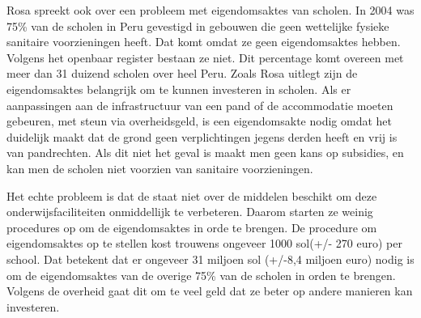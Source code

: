 Rosa spreekt ook over een probleem met eigendomsaktes van scholen. In 2004 was 75\% van de scholen in Peru gevestigd in gebouwen die geen wettelijke fysieke sanitaire voorzieningen heeft. Dat komt omdat ze geen eigendomsaktes hebben. Volgens het openbaar register bestaan ze niet. Dit percentage komt overeen met meer dan 31 duizend scholen over heel Peru. Zoals Rosa uitlegt zijn de eigendomsaktes belangrijk om te kunnen investeren in scholen. Als er aanpassingen aan de infrastructuur van een pand of de accommodatie moeten gebeuren, met steun via overheidsgeld, is een eigendomsakte nodig omdat het duidelijk maakt dat de grond geen verplichtingen jegens derden heeft en vrij is van pandrechten. Als dit niet het geval is maakt men geen kans op subsidies, en kan men de scholen niet voorzien van sanitaire voorzieningen.

Het echte probleem is dat de staat niet over de middelen beschikt om deze onderwijsfaciliteiten onmiddellijk te verbeteren. Daarom starten ze weinig procedures op om de eigendomsaktes in orde te brengen. De procedure om eigendomsaktes op te stellen kost trouwens ongeveer 1000 sol(+/- 270 euro) per school. Dat betekent dat er ongeveer 31 miljoen sol (+/-8,4 miljoen euro) nodig is om de eigendomsaktes van de overige 75\% van de scholen in orden te brengen. Volgens de overheid gaat dit om te veel geld dat ze beter op andere manieren kan investeren. \autocite{larepublica2004}
